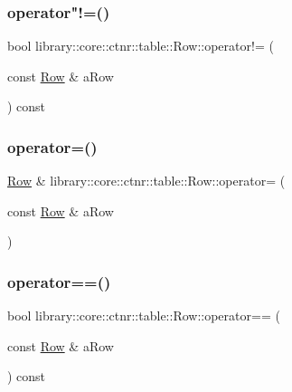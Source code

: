 \mbox{\label{classlibrary_1_1core_1_1ctnr_1_1table_1_1_row_a2c7d630e88809a564300b3c61c5124c6}} 
\subsubsection{\texorpdfstring{operator"!=()}{operator!=()}}
{\footnotesize\ttfamily bool library\+::core\+::ctnr\+::table\+::\+Row\+::operator!= (\begin{DoxyParamCaption}\item[{const \mbox{\hyperlink{classlibrary_1_1core_1_1ctnr_1_1table_1_1_row}{Row}} \&}]{a\+Row }\end{DoxyParamCaption}) const}

\mbox{\label{classlibrary_1_1core_1_1ctnr_1_1table_1_1_row_a6d6582a7ac4eba2bb7d6d34b1fa79b51}} 
\subsubsection{\texorpdfstring{operator=()}{operator=()}}
{\footnotesize\ttfamily \mbox{\hyperlink{classlibrary_1_1core_1_1ctnr_1_1table_1_1_row}{Row}} \& library\+::core\+::ctnr\+::table\+::\+Row\+::operator= (\begin{DoxyParamCaption}\item[{const \mbox{\hyperlink{classlibrary_1_1core_1_1ctnr_1_1table_1_1_row}{Row}} \&}]{a\+Row }\end{DoxyParamCaption})}

\mbox{\label{classlibrary_1_1core_1_1ctnr_1_1table_1_1_row_a0c4f807d7c22544609314c366a494ed8}} 
\subsubsection{\texorpdfstring{operator==()}{operator==()}}
{\footnotesize\ttfamily bool library\+::core\+::ctnr\+::table\+::\+Row\+::operator== (\begin{DoxyParamCaption}\item[{const \mbox{\hyperlink{classlibrary_1_1core_1_1ctnr_1_1table_1_1_row}{Row}} \&}]{a\+Row }\end{DoxyParamCaption}) const}

